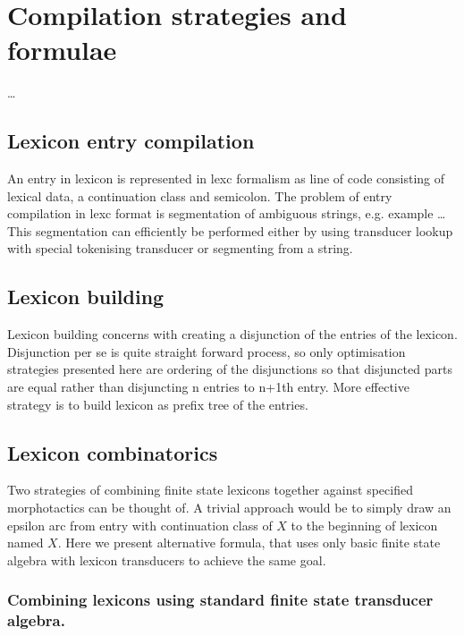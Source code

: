\documentclass{llncs}
\begin{document}
\section{Compilation strategies and formulae}

\ldots

\subsection{Lexicon entry compilation}

An entry in lexicon is represented in lexc formalism as line of code consisting
of lexical data, a continuation class and semicolon. The problem of entry
compilation in lexc format is segmentation of ambiguous strings, e.g. example
\ldots This segmentation can efficiently be performed either by using
transducer lookup with special tokenising transducer
or segmenting from a string.

\subsection{Lexicon building}

Lexicon building concerns with creating a disjunction of the entries of the
lexicon. Disjunction per se is quite straight forward process, so only
optimisation strategies presented here are ordering of the disjunctions so
that disjuncted parts are equal rather than disjuncting n entries to n+1th
entry. More effective strategy is to build lexicon as prefix tree of the
entries.

\subsection{Lexicon combinatorics}

Two strategies of combining finite state lexicons together against specified
morphotactics can be thought of. A trivial approach would be to simply draw
an epsilon arc from entry with continuation class of $X$ to the beginning of
lexicon named $X$. Here we present alternative formula, that uses only 
basic finite state algebra with lexicon transducers to achieve the same goal.


\subsubsection{Combining lexicons using standard finite state transducer algebra.}
\end{document}
